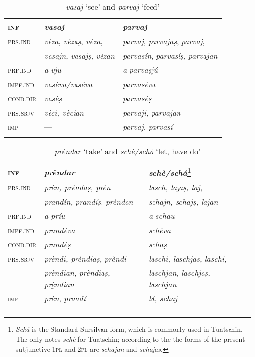 \begin{table}
	\caption{\textit{vasaj} `see' and \textit{parvaj} `feed'}

	\begin{tabular}{lll}
		\lsptoprule
		\textsc{inf} & \textbf{\textit{vasaj}} & \textbf{\textit{parvaj}}\\
		\midrule
		\textsc{prs.ind} & \textit{vèza}, \textit{vèzaṣ}, \textit{vèza}, & \textit{parvaj}, \textit{parvajaṣ}, \textit{parvaj},\\
		& \textit{vasajn}, \textit{vasajṣ}, \textit{vèzan} & \textit{parvasín}, \textit{parvasíṣ}, \textit{parvajan}\\
		\textsc{prf.ind} & \textit{a vju} & \textit{a parvaṣjú}\\
		\textsc{impf.ind} & \textit{vasèva/vaséva} & \textit{parvasèva}\\
		\textsc{cond.dir} &\textit{vasèṣ} & \textit{parvaséṣ}\\
		\textsc{prs.sbjv}	& \textit{vèci, vè̱cian} & \textit{parvaji, parvajan}\\
		\textsc{imp} & --- & \textit{parvaj}, \textit{parvasí}\\
		\lspbottomrule
	\end{tabular}
\end{table}


\begin{table}
	\caption{\textit{prèndar} `take' and \textit{schè/schá} `let, have do'}

	\begin{tabular}{llll}
		\lsptoprule
		\textsc{inf} & \textbf{\textit{prèndar}} & \textbf{\textit{schè/schá}}\footnote{\textit{Schá} is the Standard Sursilvan form, which is commonly used in Tuatschin. The \DRG{10}{499} only notes \textit{schè} for Tuatschin; according to the \DRG{10}{502} the forms of the present subjunctive \textsc{1pl} and \textsc{2pl} are \textit{schajan} and \textit{schajas}.}\\
		\midrule
		\textsc{prs.ind} & \textit{prèn, prèndaṣ, prèn} & \textit{lasch, lajaṣ, laj},\\
		& \textit{prandín, prandíṣ, prèndan} & \textit{schajn, schajṣ, lajan}\\
		\textsc{prf.ind} & \textit{a príu} & \textit{a schau}\\
		\textsc{impf.ind} & \textit{prandèva} & \textit{schèva}\\
		\textsc{cond.dir} & \textit{prandèṣ} & \textit{schaṣ}\\
		\textsc{prs.sbjv} & \textit{prèndi, prè̱ndiaṣ, prèndi} & \textit{laschi, laschjas, laschi,}\\
		& \textit{prè̱ndian, prè̱ndiaṣ, prè̱ndian} & \textit{laschjan, laschjaṣ, laschjan}\\
		\textsc{imp} & \textit{prèn}, \textit{prandí} & \textit{lá, schaj}\\
		\lspbottomrule
	\end{tabular}
\end{table}


